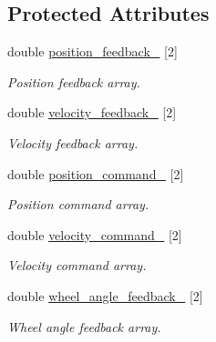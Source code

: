 \subsection*{Protected Attributes}
\begin{DoxyCompactItemize}
\item 
\mbox{\label{classBasicRobotHW_a90dca1f10ddc925ce7194fbd2478c102}} 
double \hyperlink{classBasicRobotHW_a90dca1f10ddc925ce7194fbd2478c102}{position\+\_\+feedback\+\_\+} \mbox{[}2\mbox{]}
\begin{DoxyCompactList}\small\item\em Position feedback array. \end{DoxyCompactList}\item 
\mbox{\label{classBasicRobotHW_a4857c5d15155ee70226d0df2c5a4cb13}} 
double \hyperlink{classBasicRobotHW_a4857c5d15155ee70226d0df2c5a4cb13}{velocity\+\_\+feedback\+\_\+} \mbox{[}2\mbox{]}
\begin{DoxyCompactList}\small\item\em Velocity feedback array. \end{DoxyCompactList}\item 
\mbox{\label{classBasicRobotHW_afee748bd8f37242c83de98f6c39f40c7}} 
double \hyperlink{classBasicRobotHW_afee748bd8f37242c83de98f6c39f40c7}{position\+\_\+command\+\_\+} \mbox{[}2\mbox{]}
\begin{DoxyCompactList}\small\item\em Position command array. \end{DoxyCompactList}\item 
\mbox{\label{classBasicRobotHW_a7ef5f4df8fcceab6386bc31d07da1644}} 
double \hyperlink{classBasicRobotHW_a7ef5f4df8fcceab6386bc31d07da1644}{velocity\+\_\+command\+\_\+} \mbox{[}2\mbox{]}
\begin{DoxyCompactList}\small\item\em Velocity command array. \end{DoxyCompactList}\item 
\mbox{\label{classBasicRobotHW_a49e35de85f6c83cf260af3d38c52048c}} 
double \hyperlink{classBasicRobotHW_a49e35de85f6c83cf260af3d38c52048c}{wheel\+\_\+angle\+\_\+feedback\+\_\+} \mbox{[}2\mbox{]}
\begin{DoxyCompactList}\small\item\em Wheel angle feedback array. \end{DoxyCompactList}\item 

\end{DoxyCompactItemize}
